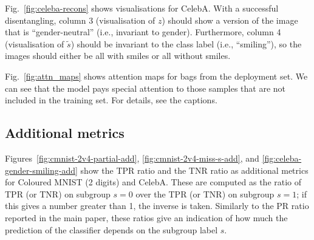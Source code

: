 Fig.~\ref{fig:celeba-recons} shows visualisations for CelebA. 
%
With a successful disentangling, column 3 (visualisation of $z$) should show a version of the image
that is ``gender-neutral'' (i.e., invariant to gender). 
%
Furthermore, column 4 (visualisation of $\tilde{s}$) should be invariant to the class label (i.e.,
``smiling''), so the images should either be all with smiles or all without smiles.

Fig.~\ref{fig:attn_maps} shows attention maps for bags from the deployment set. 
%
We can see that the model pays special attention to those samples that are not included in the
training set. For details, see the captions.

\subsection{Additional metrics}\label{sec:additional-metrics}
%
Figures~\ref{fig:cmnist-2v4-partial-add}, \ref{fig:cmnist-2v4-miss-s-add},  and
\ref{fig:celeba-gender-smiling-add} show the \ac{TPR} ratio and the \ac{TNR} ratio as additional
metrics for Coloured MNIST (2 digits) and CelebA. 
%
These are computed as the ratio of \ac{TPR} (or \ac{TNR}) on subgroup $s=0$ over the \ac{TPR} (or
\ac{TNR}) on subgroup $s=1$; if this gives a number greater than 1, the inverse is taken. 
%
Similarly to the PR ratio reported in the main paper, these ratios give an indication of how much
the prediction of the classifier depends on the subgroup label $s$.

